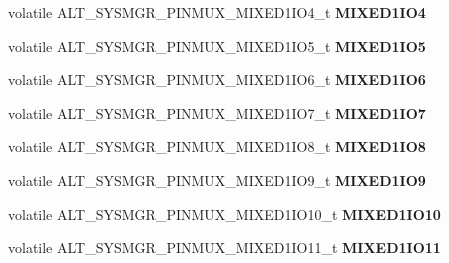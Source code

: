 \begin{DoxyCompactItemize}
volatile A\+L\+T\+\_\+\+S\+Y\+S\+M\+G\+R\+\_\+\+P\+I\+N\+M\+U\+X\+\_\+\+M\+I\+X\+E\+D1\+I\+O4\+\_\+t {\bfseries M\+I\+X\+E\+D1\+I\+O4}
\item 
\mbox{\label{structALT__SYSMGR__PINMUX__s_a6da337c1e083b8ddaa2b517e54f5d6b6}} 
volatile A\+L\+T\+\_\+\+S\+Y\+S\+M\+G\+R\+\_\+\+P\+I\+N\+M\+U\+X\+\_\+\+M\+I\+X\+E\+D1\+I\+O5\+\_\+t {\bfseries M\+I\+X\+E\+D1\+I\+O5}
\item 
\mbox{\label{structALT__SYSMGR__PINMUX__s_a0fc1d3f5f426e84291070beeec2860fa}} 
volatile A\+L\+T\+\_\+\+S\+Y\+S\+M\+G\+R\+\_\+\+P\+I\+N\+M\+U\+X\+\_\+\+M\+I\+X\+E\+D1\+I\+O6\+\_\+t {\bfseries M\+I\+X\+E\+D1\+I\+O6}
\item 
\mbox{\label{structALT__SYSMGR__PINMUX__s_aeb9b0c7923781343b819ff05466355e7}} 
volatile A\+L\+T\+\_\+\+S\+Y\+S\+M\+G\+R\+\_\+\+P\+I\+N\+M\+U\+X\+\_\+\+M\+I\+X\+E\+D1\+I\+O7\+\_\+t {\bfseries M\+I\+X\+E\+D1\+I\+O7}
\item 
\mbox{\label{structALT__SYSMGR__PINMUX__s_a481f01fd531350d77cc7b7b14a9e44a5}} 
volatile A\+L\+T\+\_\+\+S\+Y\+S\+M\+G\+R\+\_\+\+P\+I\+N\+M\+U\+X\+\_\+\+M\+I\+X\+E\+D1\+I\+O8\+\_\+t {\bfseries M\+I\+X\+E\+D1\+I\+O8}
\item 
\mbox{\label{structALT__SYSMGR__PINMUX__s_a50bacef705ce3ed6cd6e6170e2497039}} 
volatile A\+L\+T\+\_\+\+S\+Y\+S\+M\+G\+R\+\_\+\+P\+I\+N\+M\+U\+X\+\_\+\+M\+I\+X\+E\+D1\+I\+O9\+\_\+t {\bfseries M\+I\+X\+E\+D1\+I\+O9}
\item 
\mbox{\label{structALT__SYSMGR__PINMUX__s_a7eba3d97e338992e97439efeba309c45}} 
volatile A\+L\+T\+\_\+\+S\+Y\+S\+M\+G\+R\+\_\+\+P\+I\+N\+M\+U\+X\+\_\+\+M\+I\+X\+E\+D1\+I\+O10\+\_\+t {\bfseries M\+I\+X\+E\+D1\+I\+O10}
\item 
\mbox{\label{structALT__SYSMGR__PINMUX__s_a3a2139a6a2ba8f582231bb5d244396f0}} 
volatile A\+L\+T\+\_\+\+S\+Y\+S\+M\+G\+R\+\_\+\+P\+I\+N\+M\+U\+X\+\_\+\+M\+I\+X\+E\+D1\+I\+O11\+\_\+t {\bfseries M\+I\+X\+E\+D1\+I\+O11}
\item 
\mbox{\label{structALT__SYSMGR__PINMUX__s_aa1153d0764ab5362e8342f1f1ebbb784}} 

\end{DoxyCompactItemize}
